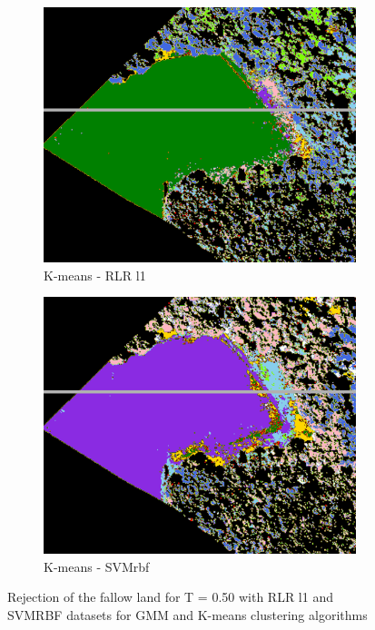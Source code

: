 \documentclass{siamart171218}
\begin{document}
\begin{figure}[h!]
\begin{subfigure}[b]{0.25\textwidth}
                \includegraphics[width=.84\linewidth]{images/Rejet_peintures_Kmeans_Log_reg_l1_T0.50_Jachere.png}
                \caption{K-means - RLR l1}
                \label{fig:Kmeans_LRL1_2}
        \end{subfigure}%
        \begin{subfigure}[b]{0.25\textwidth}
                \centering
                \includegraphics[width=.84\linewidth]{images/Rejet_peintures_Kmeans_SVM_rbf_T0.50_Jachere.png}
                \caption{K-means - SVMrbf}
                \label{fig:Kmeans_SVMrbf_2}
        \end{subfigure}
        \caption{Rejection of the fallow land for T = 0.50 with RLR l1 and SVMRBF datasets for GMM and K-means clustering algorithms}\label{fig:Fallow}
\end{figure}
\end{document}
